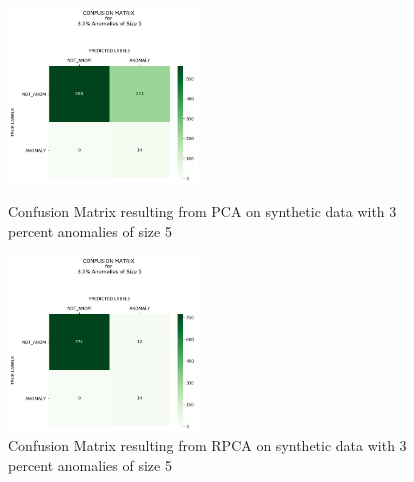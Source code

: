 \documentclass{article}
\begin{document}
\begin{figure}[H]
\begin{minipage}[b]{0.45\linewidth}
    \centering

    \includegraphics[width=50mm, scale=0.5]{cmPCATest_120AnomSize5.jpg}
    \caption{Confusion Matrix resulting from PCA on synthetic data with 3 percent anomalies of size 5}
    \label{fig::CMtrainPCA1205}
\end{minipage}
\quad
\begin{minipage}[b]{0.45\linewidth}
    \centering
    \includegraphics[width=50mm, scale=0.5]{cmRPCATest_120AnomSize5.jpg}
    \caption{Confusion Matrix resulting from RPCA on synthetic data with 3 percent anomalies of size 5}
    \label{fig::CMtrainRPCA125}
\end{minipage}
\end{figure}

\end{document}
